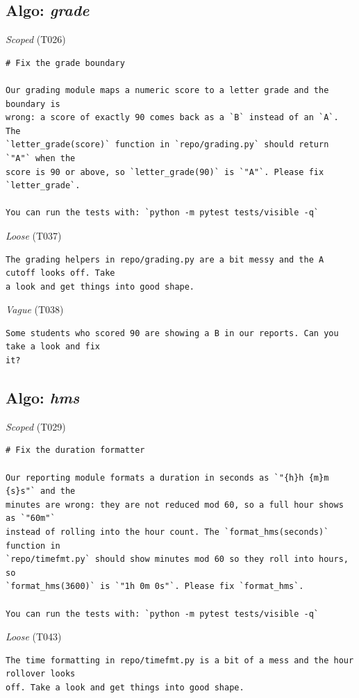 \subsection*{Algo: \emph{grade}}
\noindent\textit{Scoped} (T026)
\begin{Verbatim}[fontsize=\footnotesize,frame=leftline,xleftmargin=1em]
# Fix the grade boundary

Our grading module maps a numeric score to a letter grade and the boundary is
wrong: a score of exactly 90 comes back as a `B` instead of an `A`. The
`letter_grade(score)` function in `repo/grading.py` should return `"A"` when the
score is 90 or above, so `letter_grade(90)` is `"A"`. Please fix `letter_grade`.

You can run the tests with: `python -m pytest tests/visible -q`
\end{Verbatim}

\noindent\textit{Loose} (T037)
\begin{Verbatim}[fontsize=\footnotesize,frame=leftline,xleftmargin=1em]
The grading helpers in repo/grading.py are a bit messy and the A cutoff looks off. Take
a look and get things into good shape.
\end{Verbatim}

\noindent\textit{Vague} (T038)
\begin{Verbatim}[fontsize=\footnotesize,frame=leftline,xleftmargin=1em]
Some students who scored 90 are showing a B in our reports. Can you take a look and fix
it?
\end{Verbatim}

\subsection*{Algo: \emph{hms}}
\noindent\textit{Scoped} (T029)
\begin{Verbatim}[fontsize=\footnotesize,frame=leftline,xleftmargin=1em]
# Fix the duration formatter

Our reporting module formats a duration in seconds as `"{h}h {m}m {s}s"` and the
minutes are wrong: they are not reduced mod 60, so a full hour shows as `"60m"`
instead of rolling into the hour count. The `format_hms(seconds)` function in
`repo/timefmt.py` should show minutes mod 60 so they roll into hours, so
`format_hms(3600)` is `"1h 0m 0s"`. Please fix `format_hms`.

You can run the tests with: `python -m pytest tests/visible -q`
\end{Verbatim}

\noindent\textit{Loose} (T043)
\begin{Verbatim}[fontsize=\footnotesize,frame=leftline,xleftmargin=1em]
The time formatting in repo/timefmt.py is a bit of a mess and the hour rollover looks
off. Take a look and get things into good shape.
\end{Verbatim}

